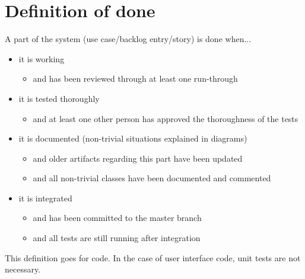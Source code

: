 \section{Definition of done}
\label{sec:definition-of-done}

A part of the system (use case/backlog entry/story) is done when...
\begin{itemize}
    \item it is working
    \begin{itemize}
        \item and has been reviewed through at least one run-through
    \end{itemize}
    \item it is tested thoroughly
    \begin{itemize}
        \item and at least one other person has approved the thoroughness of the tests
    \end{itemize}
    \item it is documented (non-trivial situations explained in diagrams)
    \begin{itemize}
        \item and older artifacts regarding this part have been updated
        \item and all non-trivial classes have been documented and commented
    \end{itemize}
    \item it is integrated
    \begin{itemize}
        \item and has been committed to the master branch
        \item and all tests are still running after integration
    \end{itemize}
\end{itemize}

This definition goes for code. In the case of user interface code, unit tests are not necessary.